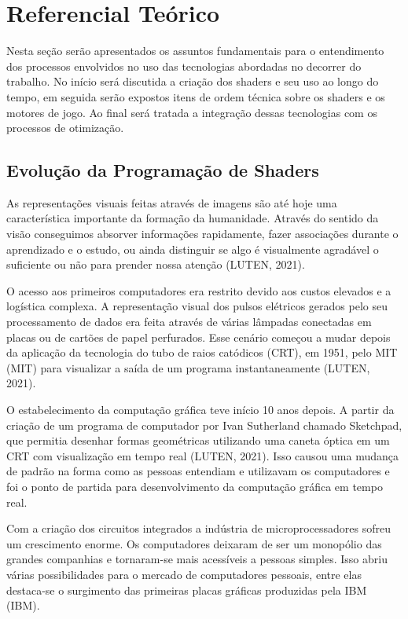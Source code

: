 \chapter{Referencial Teórico}
\label{cap:referencial-teorico}

Nesta seção serão apresentados os assuntos fundamentais para o entendimento dos processos envolvidos no uso das tecnologias abordadas no decorrer do trabalho. No início será discutida a criação dos shaders e seu uso ao longo do tempo, em seguida serão expostos itens de ordem técnica sobre os shaders e os motores de jogo. Ao final será tratada a integração dessas tecnologias com os processos de otimização.

\section{Evolução da Programação de Shaders}
\label{sec:historia-evolucao-programacao-shaders}

As representações visuais feitas através de imagens são até hoje uma característica importante da formação da humanidade. Através do sentido da visão conseguimos absorver informações rapidamente, fazer associações durante o aprendizado e o estudo, ou ainda distinguir se algo é visualmente agradável o suficiente ou não para prender nossa atenção (LUTEN, 2021)\nocite{openGLBook}.

O acesso aos primeiros computadores era restrito devido aos custos elevados e a logística complexa. A representação visual dos pulsos elétricos gerados pelo seu processamento de dados era feita através de várias lâmpadas conectadas em placas ou de cartões de papel perfurados. Esse cenário começou a mudar depois da aplicação da tecnologia do tubo de raios catódicos (\acrshort{CRT}), em 1951, pelo \acrlong{MIT} (MIT) para visualizar a saída de um programa instantaneamente (LUTEN, 2021)\nocite{openGLBook}.

O estabelecimento da computação gráfica teve início 10 anos depois. A partir da criação de um programa de computador por Ivan Sutherland chamado Sketchpad, que permitia desenhar formas geométricas utilizando uma caneta óptica em um \acrshort{CRT} com visualização em tempo real (LUTEN, 2021)\nocite{openGLBook}. Isso causou uma mudança de padrão na forma como as pessoas entendiam e utilizavam os computadores e foi o ponto de partida para desenvolvimento da computação gráfica em tempo real.
	
Com a criação dos circuitos integrados a indústria de microprocessadores sofreu um crescimento enorme. Os computadores deixaram de ser um monopólio das grandes companhias e tornaram-se mais acessíveis a pessoas simples. Isso abriu várias possibilidades para o mercado de computadores pessoais, entre elas destaca-se o surgimento das primeiras placas gráficas produzidas pela IBM (\acrlong{IBM}).   
	
